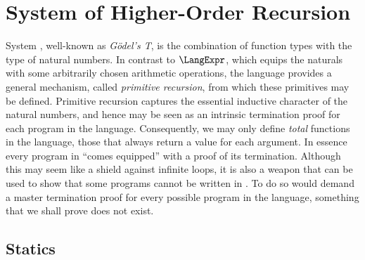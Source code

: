 \chapter{System \LangT{} of Higher-Order Recursion}

System \LangT{}, well-known as \emph{G\"{o}del's T}, is the
combination of function types with the type of natural numbers.  In
contrast to $\LangExpr$, which equips the naturals with some
arbitrarily chosen arithmetic operations, the language \LangT{}
provides a general mechanism, called \emph{primitive recursion}, from
which these primitives may be defined.  Primitive recursion captures
the essential inductive character of the natural numbers, and hence
may be seen as an intrinsic termination proof for each program in the
language.  Consequently, we may only define \emph{total} functions in
the language, those that always return a value for each argument.  In
essence every program in \LangT{} ``comes equipped'' with a proof of
its termination.  Although this may seem like a shield against
infinite loops, it is also a weapon that can be used to show that some
programs cannot be written in \LangT{}.  To do so would demand a
master termination proof for every possible program in the language,
something that we shall prove does not exist.

\section{Statics}

